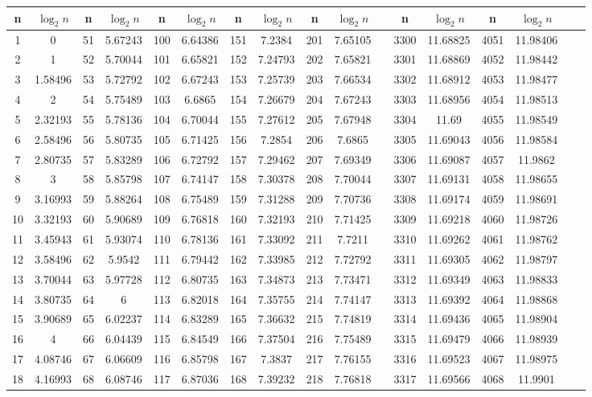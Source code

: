 {\footnotesize
\begin{tabular}[h]{|cc|cc|cc|cc|cc|c|cc|cc|cc|}\hline
n&$\log_2n$&n&$\log_2n$&n&$\log_2n$&n&$\log_2n$&n&$\log_2n$&
&n&$\log_2n$&n&$\log_2n$ \\ \hline
1&0&51&5.67243&100&6.64386&151&7.2384&201&7.65105& &3300&11.68825&4051&11.98406\\ 
2&1&52&5.70044&101&6.65821&152&7.24793&202&7.65821& &3301&11.68869&4052&11.98442\\ 
3&1.58496&53&5.72792&102&6.67243&153&7.25739&203&7.66534& &3302&11.68912&4053&11.98477\\ 
4&2&54&5.75489&103&6.6865&154&7.26679&204&7.67243& &3303&11.68956&4054&11.98513\\ 
5&2.32193&55&5.78136&104&6.70044&155&7.27612&205&7.67948& &3304&11.69&4055&11.98549\\ 
6&2.58496&56&5.80735&105&6.71425&156&7.2854&206&7.6865& &3305&11.69043&4056&11.98584\\ 
7&2.80735&57&5.83289&106&6.72792&157&7.29462&207&7.69349& &3306&11.69087&4057&11.9862\\ 
8&3&58&5.85798&107&6.74147&158&7.30378&208&7.70044& &3307&11.69131&4058&11.98655\\ 
9&3.16993&59&5.88264&108&6.75489&159&7.31288&209&7.70736& &3308&11.69174&4059&11.98691\\ 
10&3.32193&60&5.90689&109&6.76818&160&7.32193&210&7.71425& &3309&11.69218&4060&11.98726\\ 
11&3.45943&61&5.93074&110&6.78136&161&7.33092&211&7.7211& &3310&11.69262&4061&11.98762\\ 
12&3.58496&62&5.9542&111&6.79442&162&7.33985&212&7.72792& &3311&11.69305&4062&11.98797\\ 
13&3.70044&63&5.97728&112&6.80735&163&7.34873&213&7.73471& &3312&11.69349&4063&11.98833\\ 
14&3.80735&64&6&113&6.82018&164&7.35755&214&7.74147& &3313&11.69392&4064&11.98868\\ 
15&3.90689&65&6.02237&114&6.83289&165&7.36632&215&7.74819& &3314&11.69436&4065&11.98904\\ 
16&4&66&6.04439&115&6.84549&166&7.37504&216&7.75489& &3315&11.69479&4066&11.98939\\ 
17&4.08746&67&6.06609&116&6.85798&167&7.3837&217&7.76155& &3316&11.69523&4067&11.98975\\ 
18&4.16993&68&6.08746&117&6.87036&168&7.39232&218&7.76818& &3317&11.69566&4068&11.9901\\ 

\end{tabular}}
